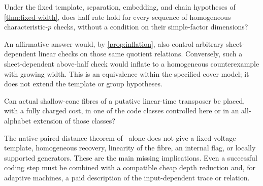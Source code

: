 \begin{question}\label{prob:all-width}
Under the fixed template, separation, embedding, and chain hypotheses
of \cref{thm:fixed-width}, does half rate hold for every sequence of
homogeneous characteristic-$p$ checks, without a condition on their
simple-factor dimensions?
\end{question}
An affirmative answer would, by \cref{prop:inflation}, also control
arbitrary sheet-dependent linear checks on those same quotient
relations. Conversely, such a sheet-dependent above-half check
would inflate to a homogeneous counterexample with growing width.
This is an equivalence within the specified cover model; it does
not extend the template or group hypotheses.

\begin{question}
\label{prob:native}
Can actual shallow-cone fibres of a putative linear-time transposer
be placed, with a fully charged cost, in one of the code classes
controlled here or in an all-alphabet extension of those classes?
\end{question}
The native paired-distance theorem of~\cite{BrendeDirected} alone
does not give a fixed voltage template, homogeneous recovery,
linearity of the fibre, an internal flag, or locally supported
generators. These are the main missing implications. Even a
successful coding step must be combined with a compatible cheap
depth reduction and, for adaptive machines, a paid description of
the input-dependent trace or relation.

